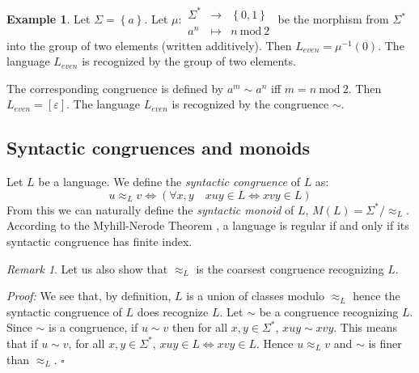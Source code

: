 \documentclass[12pt]{report}
\theoremstyle{definition}
\newtheorem{xmp}{Example}[section]
\theoremstyle{remark}
\newtheorem{rmk}{Remark}[section]
\newenvironment{prf}
{\textit{Proof:}}
{\hfill $\square$\\}
\begin{document}
\begin{xmp}
Let $\Sigma=\left\{a\right\}$.
Let $\mu:\begin{array}{rcl}
\Sigma^\ast &\rightarrow &\left\{0,1\right\}\\
a^n &\mapsto & n\ \mathrm{mod}\ 2
\end{array}$ be the morphism from $\Sigma^\ast$ into the group of two elements (written additively).
Then $L_{even}=\mu^{-1}(0)$. The language $L_{even}$ is recognized by the group of two elements.

The corresponding congruence is defined by $a^m\sim a^n$ iff $m=n\ \mathrm{mod}\ 2$.
Then $L_{even}=[\varepsilon]$. The language $L_{even}$ is recognized by the congruence $\sim$.
\end{xmp}

\subsection{Syntactic congruences and monoids}
Let $L$ be a language. We define the \emph{syntactic congruence} of $L$ as:
$$u\approx_L v \Leftrightarrow \left( \forall x,y\quad xuy\in L \Leftrightarrow xvy\in L \right)$$
From this we can naturally define the \emph{syntactic monoid} of $L$,  $M(L)=\Sigma^\ast/\approx_L$.
According to the Myhill-Nerode Theorem \cite{nerode58}, a language is regular if and only if its syntactic congruence has finite index.

\begin{rmk}
\label{rmk2}
Let us also show that $\approx_L$ is the coarsest congruence recognizing $L$.
\end{rmk}

\begin{prf}
We see that, by definition, $L$ is a union of classes modulo $\approx_L$ hence the syntactic congruence of $L$ does recognize $L$.
Let $\sim$ be a congruence  recognizing $L$.
Since $\sim$ is a congruence, if $u\sim v$ then for all $x,y\in \Sigma^\ast$, $xuy\sim xvy$. This means that if $u\sim v$, for all $x,y\in \Sigma^\ast$, $xuy\in L \Leftrightarrow xvy\in L$. Hence $u\approx_L v$ and $\sim$ is finer than $\approx_L$.
\end{prf}
\end{document}
